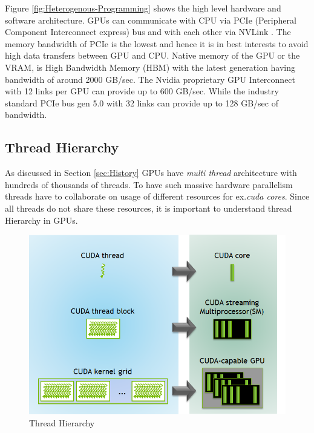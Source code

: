 Figure \ref{fig:Heterogenous-Programming} shows the high level hardware and software architecture.
GPUs can communicate with CPU via PCIe (Peripheral Component Interconnect express) bus and with each other via NVLink \texttrademark.
The memory bandwidth of PCIe is the lowest and hence it is in best interests to avoid high data transfers between GPU and CPU.
Native memory of the GPU or the VRAM, is High Bandwidth Memory (HBM) with the latest generation having bandwidth of around 2000 GB/sec.
The Nvidia proprietary GPU Interconnect with 12 links per GPU can provide up to 600 GB/sec.
While the industry standard PCIe bus gen 5.0 with 32 links can provide up to 128 GB/sec of bandwidth.

\subsection{Thread Hierarchy}\label{sec:thread-hierarchy}
As discussed in Section \ref{sec:History} GPUs have \textit{multi thread} architecture with hundreds of thousands of threads. To have such massive hardware parallelism threads have to collaborate on usage of different resources for ex.\textit{cuda cores}.
%
Since all threads do not share these resources, it is important to understand thread Hierarchy in GPUs.

\begin{figure}[h]
    \includegraphics[width=\textwidth]{fig/thread-hierarchy.png}
    \caption{Thread Hierarchy}
    \label{fig:Thread-Hierarchy}
\end{figure}

